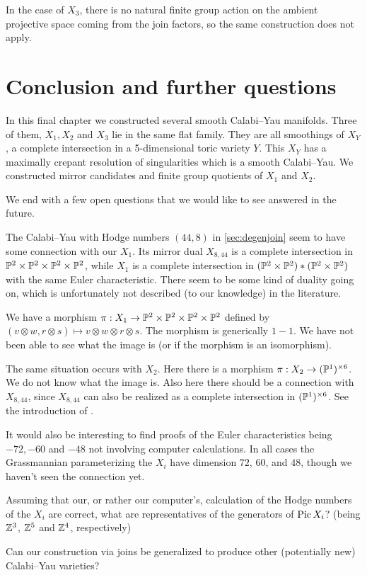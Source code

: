 In the case of $X_3$, there is no natural finite group action on the ambient projective space coming from the join factors, so the same construction does not apply.

\section{Conclusion and further questions}

In this final chapter we constructed several smooth Calabi--Yau manifolds. Three of them, $X_1,X_2$ and $X_3$ lie in the same flat family. They are all smoothings of $X_Y$, a complete intersection in a 5-dimensional toric variety $Y$. This $X_Y$ has a maximally crepant resolution of singularities which is a smooth Calabi--Yau. We constructed mirror candidates and finite group quotients of $X_1$ and $X_2$.

We end with a few open questions that we would like to see answered in the future. 

The Calabi--Yau with Hodge numbers $(44,8)$ in \cref{sec:degenjoin} seem to have some connection with our $X_1$. Its mirror dual $X_{8,44}$ is a complete intersection in $\P^2 \times \P^2 \times \P^2 \times \P^2$, while $X_1$ is a complete intersection in $(\P^2 \times \P^2) \ast (\P^2 \times \P^2)$ with the same Euler characteristic. There seem to be some kind of duality going on, which is unfortunately not described (to our knowledge) in the literature.

We have a morphism $\pi:X_1 \to \P^2 \times \P^2 \times \P^2 \times \P^2$ defined by $(v \otimes w, r \otimes s) \mapsto v \otimes w \otimes r \otimes s$. The morphism is generically $1-1$. We have not been able to see what the image is (or if the morphism is an isomorphism).

The same situation occurs with $X_2$. Here there is a morphism ${\pi:X_2 \to (\P^1)^{\times 6}}$. We do not know what the image is. Also here there should be a connection with $X_{8,44}$, since $X_{8,44}$ can also be realized as a complete intersection in $(\P^1)^{\times 6}$. See the introduction of \cite{braun_smallhodgenumbers}.

It would also be interesting to find proofs of the Euler characteristics being $-72,-60$ and $-48$ not involving computer calculations. In all cases the Grassmannian parameterizing the $X_i$ have dimension $72$, $60$, and $48$, though we haven't seen the connection yet.

Assuming that our, or rather our computer's, calculation of the Hodge numbers of the $X_i$ are correct, what are representatives of the generators of $\Pic X_i$? (being $\Z^3$, $\Z^5$ and $\Z^4$, respectively)

Can our construction via joins be generalized to produce other (potentially new) Calabi--Yau varieties?
